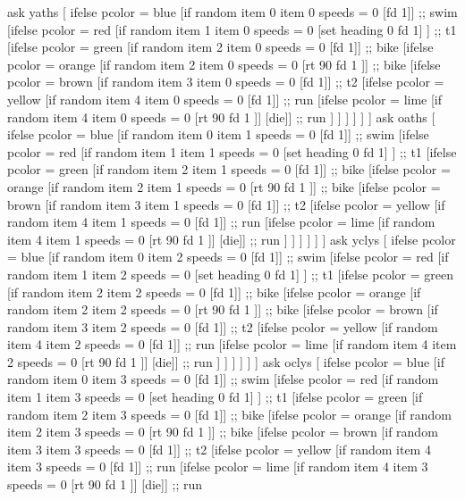 \documentclass[12pt]{article}
\begin{document}
  ask yaths [
    ifelse pcolor = blue [if random item 0 item 0 speeds  = 0 [fd 1]] ;; swim
    [ifelse pcolor = red [if random item 1 item 0 speeds  = 0 [set heading 0 fd 1] ] ;; t1
     [ifelse pcolor = green [if random item 2 item 0 speeds  = 0 [fd 1]] ;; bike
       [ifelse pcolor = orange [if random item 2 item 0 speeds  = 0 [rt 90 fd 1 ]] ;; bike
         [ifelse pcolor = brown [if random item 3 item 0 speeds  = 0 [fd 1]] ;; t2
           [ifelse pcolor = yellow [if random item 4 item 0 speeds  = 0 [fd 1]] ;; run
             [ifelse pcolor = lime [if random item 4 item 0 speeds  = 0 [rt 90 fd 1 ]] [die]] ;; run
             ]
           ]
         ]
       ]
     ]
    ]
    ask oaths [
    ifelse pcolor = blue [if random item 0 item 1 speeds  = 0 [fd 1]] ;; swim
    [ifelse pcolor = red [if random item 1 item 1 speeds  = 0 [set heading 0 fd 1] ] ;; t1
     [ifelse pcolor = green [if random item 2 item 1 speeds  = 0 [fd 1]] ;; bike
       [ifelse pcolor = orange [if random item 2 item 1 speeds  = 0 [rt 90 fd 1 ]] ;; bike
         [ifelse pcolor = brown [if random item 3 item 1 speeds  = 0 [fd 1]] ;; t2
           [ifelse pcolor = yellow [if random item 4 item 1 speeds  = 0 [fd 1]] ;; run
             [ifelse pcolor = lime [if random item 4 item 1 speeds  = 0 [rt 90 fd 1 ]] [die]] ;; run
             ]
           ]
         ]
       ]
     ]
    ]
  ask yclys [
    ifelse pcolor = blue [if random item 0 item 2 speeds  = 0 [fd 1]] ;; swim
    [ifelse pcolor = red [if random item 1 item 2 speeds  = 0 [set heading 0 fd 1] ] ;; t1
     [ifelse pcolor = green [if random item 2 item 2 speeds  = 0 [fd 1]] ;; bike
       [ifelse pcolor = orange [if random item 2 item 2 speeds  = 0 [rt 90 fd 1 ]] ;; bike
         [ifelse pcolor = brown [if random item 3 item 2 speeds  = 0 [fd 1]] ;; t2
           [ifelse pcolor = yellow [if random item 4 item 2 speeds  = 0 [fd 1]] ;; run
             [ifelse pcolor = lime [if random item 4 item 2 speeds  = 0 [rt 90 fd 1 ]] [die]] ;; run
             ]
           ]
         ]
       ]
     ]
    ]
  ask oclys [
    ifelse pcolor = blue [if random item 0 item 3 speeds  = 0 [fd 1]] ;; swim
    [ifelse pcolor = red [if random item 1 item 3 speeds  = 0 [set heading 0 fd 1] ] ;; t1
     [ifelse pcolor = green [if random item 2 item 3 speeds  = 0 [fd 1]] ;; bike
       [ifelse pcolor = orange [if random item 2 item 3 speeds  = 0 [rt 90 fd 1 ]] ;; bike
         [ifelse pcolor = brown [if random item 3 item 3 speeds  = 0 [fd 1]] ;; t2
           [ifelse pcolor = yellow [if random item 4 item 3 speeds  = 0 [fd 1]] ;; run
             [ifelse pcolor = lime [if random item 4 item 3 speeds  = 0 [rt 90 fd 1 ]] [die]] ;; run
\end{document}
